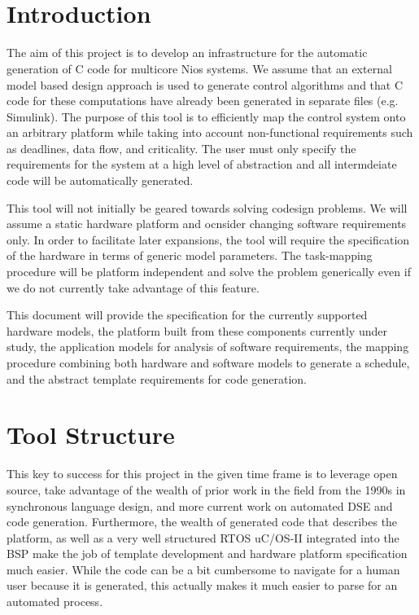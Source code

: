 \documentclass{article}
\title{
\vspace{2in}
\textmd{\textbf{\hmwkTitle}}\\
\vspace{3in}
}
\author{\textbf{\hmwkAuthorName}}
\date{} %
\begin{document}
\maketitle
\thispagestyle{empty}
\newpage
\setcounter{page}{1}

\section{Introduction}

The aim of this project is to develop an infrastructure for the automatic generation of C code for multicore Nios systems. We assume that an external model based design approach is used to generate control algorithms and that C code for these computations have already been generated in separate files (e.g. Simulink). The purpose of this tool is to efficiently map the control system onto an arbitrary platform while taking into account non-functional requirements such as deadlines, data flow, and criticality. The user must only specify the requirements for the system at a high level of abstraction and all intermdeiate code will be automatically generated. 

This tool will not initially be geared towards solving codesign problems. We will assume a static hardware platform and ocnsider changing software requirements only. In order to facilitate later expansions, the tool will require the specification of the hardware in terms of generic model parameters. The task-mapping procedure will be platform independent and solve the problem generically even if we do not currently take advantage of this feature.

This document will provide the specification for the currently supported hardware models, the platform built from these components currently under study, the application models for analysis of software requirements, the mapping procedure combining both hardware and software models to generate a schedule, and the abstract template requirements for code generation.

\section{Tool Structure}

This key to success for this project in the given time frame is to leverage open source, take advantage of the wealth of prior work in the field from the 1990s in synchronous language design, and more current work on automated DSE and code generation. Furthermore, the wealth of generated code that describes the platform, as well as a very well structured RTOS uC/OS-II integrated into the BSP make the job of template development and hardware platform specification much easier. While the code can be a bit cumbersome to navigate for a human user because it is generated, this actually makes it much easier to parse for an automated process.
\end{document}
